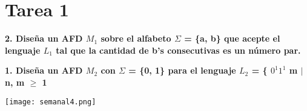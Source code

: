 \renewcommand{\labelenumi}{\alph{enumi})}
\section*{Tarea 1}
\textbf{2. 
Diseña un AFD $M_{1}$ sobre el alfabeto $\Sigma$ = \{a, b\} que acepte el lenguaje $L_{1}$ tal que la cantidad de b’s
consecutivas es un número par.}

\textbf{1. 
Diseña un AFD $M_{2}$ con $\Sigma$ = \{0, 1\} para el lenguaje $L_{2}$ = \{
$0^{1}1^{1}$ m $|$ n, m $\geq$ 1}


\texttt{[image: semanal4.png]}